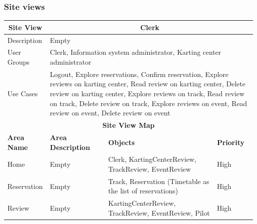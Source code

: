 \documentclass{beamer}
\begin{document}
\begin{frame}
    \frametitle{Site views}
    \begin{table}
        \centering
        \tiny
        \setlength{\tabcolsep}{1pt}
        \begin{tabular}{|m{2cm}|m{4cm}|m{3cm}|m{1cm}|}
        \hline
        \multicolumn{1}{|c|}{\textbf{Site View}} & \multicolumn{3}{c|}{\textbf{Clerk}} \\
        \hline
        Description & \multicolumn{3}{m{8cm}|}{Empty} \\
        \hline
        User Groups & \multicolumn{3}{m{8cm}|}{Clerk, 
        Information system administrator, Karting center administrator} \\
        \hline
        Use Cases & \multicolumn{3}{m{8cm}|}{Logout, Explore reservations, Confirm reservation,
        Explore reviews on karting center, Read review on karting center, Delete review on karting center,
        Explore reviews on track, Read review on track, Delete review on track, Explore reviews on event,
        Read review on event, Delete review on event} \\
        \hline
        \multicolumn{4}{|c|}{\textbf{Site View Map}} \\
        \hline
        \textbf{Area Name} & \textbf{Area Description} & \textbf{Objects} & \textbf{Priority} \\
        \hline
        Home & Empty & Clerk, KartingCenterReview, TrackReview, EventReview & High \\
        \hline
        Reservation & Empty & Track, Reservation (Timetable as the list of reservations) & High \\
        \hline
        Review & Empty & KartingCenterReview, TrackReview, EventReview, Pilot & High \\
        \hline
        \end{tabular}
    \end{table}
\end{frame}
\end{document}
